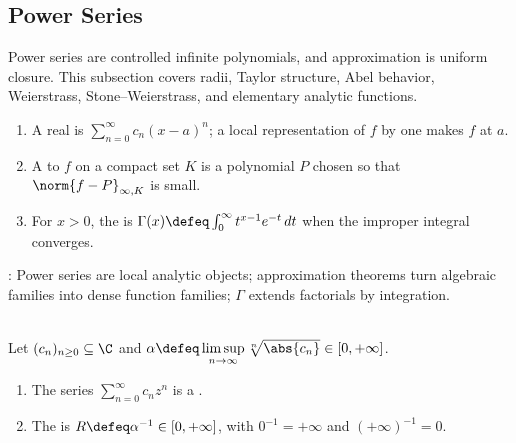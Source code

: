 \subsection{Power Series}

%


Power series are controlled infinite polynomials, and approximation is uniform closure. This subsection covers radii, Taylor structure, Abel behavior, Weierstrass, Stone--Weierstrass, and elementary analytic functions.

\begin{definition} \label{def:power-approx-fourier-core-source-todo}\label{def:power-approx-core-objects} 
\begin{enumerate}[label=(\roman*)]
\setlength{\itemsep}{0pt}
\item A real  is $\sum\limits_{n=0}^{\infty}c_n(x-a)^n$; a local representation of $f$ by one makes $f$  at $a$.
\item A  to $f$ on a compact set $K$ is a polynomial $P$ chosen so that $\norm{f-P}_{\infty,K}$ is small.
\item For $x>0$, the  is $\Gamma(x)\defeq\int_0^\infty t^{x-1}e^{-t}\,dt$ when the improper integral converges.
\end{enumerate}
: Power series are local analytic objects; approximation theorems turn algebraic families into dense function families; $\Gamma$ extends factorials by integration.
\end{definition}

\begin{definition} \label{def:power-series-radius-basic} \\
Let $(c_n)_{n\geq0}\subseteq\C$ and $\alpha\defeq\limsup\limits_{n\to\infty}\sqrt[n]{\abs{c_n}}\in[0,+\infty]$.
\begin{enumerate}[label=(\roman*)]
\setlength{\itemsep}{0pt}
\item The series $\sum\limits_{n=0}^{\infty}c_nz^n$ is a .
\item The  is $R\defeq\alpha^{-1}\in[0,+\infty]$, with $0^{-1}=+\infty$ and $(+\infty)^{-1}=0$.
\end{enumerate}
\end{definition}

